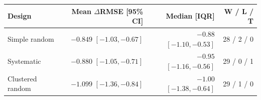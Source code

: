 \begin{tabular}{lrrr}
\toprule
Design & Mean $\Delta$RMSE [95\% CI] & Median [IQR] & W / L / T \\
\midrule
Simple random & $-0.849$ $[-1.03, -0.67]$ & $-0.88$ $[-1.10, -0.53]$ & 28 / 2 / 0 \\
Systematic & $-0.880$ $[-1.05, -0.71]$ & $-0.95$ $[-1.16, -0.56]$ & 29 / 0 / 1 \\
Clustered random & $-1.099$ $[-1.36, -0.84]$ & $-1.00$ $[-1.38, -0.64]$ & 29 / 1 / 0 \\
\bottomrule
\end{tabular}
